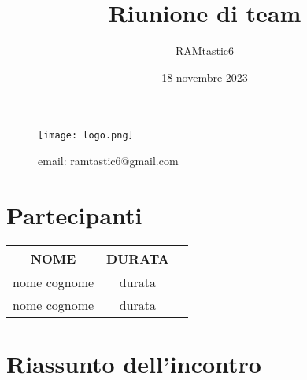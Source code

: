 \documentclass[12pt, oneside]{article}
\author{RAMtastic6}
\begin{document}
\title{Riunione di team}
\date{18 novembre 2023} %

\maketitle
\begin{figure}[h]
	\centering
	\texttt{[image: logo.png]}
	\caption{email: ramtastic6@gmail.com}
	\label{}
\end{figure}

\tableofcontents
\newpage

\section{Partecipanti}

\begin{center}
	\begin{tabular}{ | c | c | c | }
		\hline
		NOME & DURATA \\ 
		\hline
		nome cognome & durata \\  
		\hline 
		nome cognome & durata \\   
		\hline
	\end{tabular}
\end{center}

\section{Riassunto dell'incontro}
\end{document}
